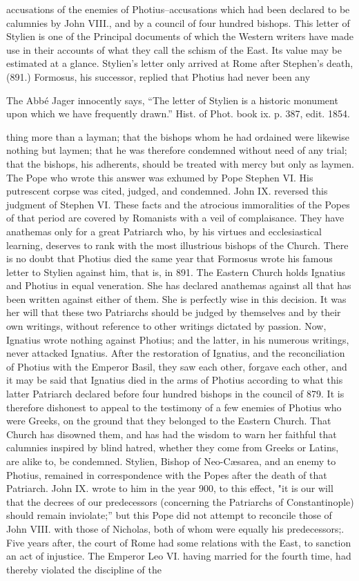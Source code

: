 accusations of the enemies of Photius--accusations which had been declared to be calumnies by John VIII., and by a council of four hundred bishops. This letter of Stylien is one of the Principal documents of which the Western writers have made use in their accounts of what they call the schism of the East. Its value may be estimated at a glance. Stylien’s letter only arrived at Rome after Stephen’s death, (891.) Formosus, his successor, replied that Photius had never been any

The Abbé Jager innocently says, “The letter of Stylien is a historic monument upon which we have frequently drawn.” Hist. of Phot. book ix. p. 387, edit. 1854.

thing more than a layman; that the bishops whom he had ordained were likewise nothing but laymen; that he was therefore condemned without need of any trial; that the bishops, his adherents, should be treated with mercy but only as laymen. The Pope who wrote this answer was exhumed by Pope Stephen VI. His putrescent corpse was cited, judged, and condemned. John IX. reversed this judgment of Stephen VI. These facts and the atrocious immoralities of the Popes of that period are covered by Romanists with a veil of complaisance. They have anathemas only for a great Patriarch who, by his virtues and ecclesiastical learning, deserves to rank with the most illustrious bishops of the Church. There is no doubt that Photius died the same year that Formosus wrote his famous letter to Stylien against him, that is, in 891. The Eastern Church holds Ignatius and Photius in equal veneration. She has declared anathemas against all that has been written against either of them. She is perfectly wise in this decision. It was her will that these two Patriarchs should be judged by themselves and by their own writings, without reference to other writings dictated by passion. Now, Ignatius wrote nothing against Photius; and the latter, in his numerous writings, never attacked Ignatius. After the restoration of Ignatius, and the reconciliation of Photius with the Emperor Basil, they saw each other, forgave each other, and it may be said that Ignatius died in the arms of Photius according to what this latter Patriarch declared before four hundred bishops in the council of 879. It is therefore dishonest to appeal to the testimony of a few enemies of Photius who were Greeks, on the ground that they belonged to the Eastern Church. That Church has disowned them, and has had the wisdom to warn her faithful that calumnies inspired by blind hatred, whether they come from Greeks or Latins, are alike to, be condemned. Stylien, Bishop of Neo-Cæsarea, and an enemy to Photius, remained in correspondence with the Popes after the death of that Patriarch. John IX. wrote to him in the year 900, to this effect, "it is our will that the decrees of our predecessors (concerning the Patriarchs of Constantinople) should remain inviolate;” but this Pope did not attempt to reconcile those of John VIII. with those of Nicholas, both of whom were equally his predecessors;. Five years after, the court of Rome had some relations with the East, to sanction an act of injustice. The Emperor Leo VI. having married for the fourth time, had thereby violated the discipline of the 